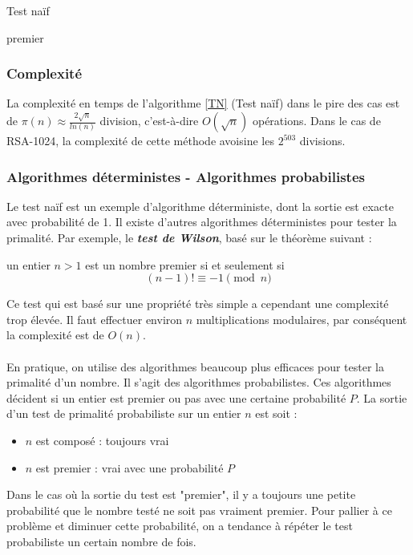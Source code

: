 			\begin{algorithm}
				\caption{Test naïf}\label{TN}
			\Retour premier\;
			\end{algorithm}
				
			\subsubsection*{Complexité}
				La complexité en temps de l'algorithme \ref{TN} (Test naïf) dans le pire des cas est de $\pi(n) \approx \frac{2\sqrt{n}}{ln(n)}$ division, c'est-à-dire $O(\sqrt{n})$ opérations. Dans le cas de RSA-1024, la complexité de cette méthode avoisine les $2^{503}$ divisions.
				
			\subsubsection*{Algorithmes déterministes - Algorithmes probabilistes}
				Le test naïf est un exemple d'algorithme déterministe, dont la sortie est exacte avec probabilité de 1. Il existe d'autres algorithmes déterministes pour tester la primalité. Par exemple, le \textit{\textbf{test de Wilson}}, basé sur le théorème suivant :
				
				\vspace{-1.5em}\begin{adjustwidth}{1.5cm}{1.5cm} 
				\begin{Th}
					un entier $n > 1$ est un nombre premier si et seulement si
					\[(n-1)! \equiv -1 \pmod n\]
				\end{Th}
				\end{adjustwidth}\vspace{0.5em}
				
				Ce test qui est basé sur une propriété très simple a cependant une complexité trop élevée. Il faut effectuer environ $n$ multiplications modulaires, par conséquent la complexité est de $O(n)$.
				
				\paragraph{} En pratique, on utilise des algorithmes beaucoup plus efficaces pour tester la primalité d'un nombre. Il s'agit des algorithmes probabilistes. Ces algorithmes décident si un entier est premier ou pas avec une certaine probabilité $P$. La sortie d'un test de primalité probabiliste sur un entier $n$ est soit :
				\begin{itemize}
					\item $n$ est composé : toujours vrai
					\item $n$ est premier : vrai avec une probabilité $P$
				\end{itemize}
				Dans le cas où la sortie du test est "premier", il y a toujours une petite probabilité que le nombre testé ne soit pas vraiment premier. Pour pallier à ce problème et diminuer cette probabilité, on a tendance à répéter le test probabiliste un certain nombre de fois.
			
